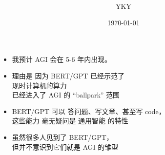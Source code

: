 

\usepackage{color}
\usepackage{mathtools}
\usepackage{hyperref}

%

\usepackage{graphicx} %
\usepackage{tikz-cd}
\usepackage{tikz}
\usepackage[export]{adjustbox}%
\usepackage{verbatim} %


\newcommand{\underdash}[1]{%
	\tikz[baseline=(toUnderline.base)]{
		\node[inner sep=1pt,outer sep=10pt] (toUnderline) {#1};
		\draw[dashed] ([yshift=-0pt]toUnderline.south west) -- ([yshift=-0pt]toUnderline.south east);
	}%
}%


\newcommand{\highlight}[1]{\colorbox{pink}{$\displaystyle #1$}}

\let\oldtextbf\textbf
\renewcommand{\textbf}[1]{\textcolor{blue}{\oldtextbf{#1}}}

\newcommand{\emp}[1]{{\color{blue}\textbf{#1}}}
\newcommand*\confoundFace{$\vcenter{\hbox{\texttt{[image: ../2020/../confounded-face.jpg]}}}$}
\newcommand{\underconst}{\texttt{[image: ../2020/UnderConst.png]}}
\newcommand{\witness}{\scalebox{0.6}{$\blacksquare$}}
\providecommand\Heytingarrow{\relbar\joinrel\mathrel{\vcenter{\hbox{\scalebox{0.75}{$\rhd$}}}}}



\title{\bfseries\color{blue}{\Huge《AGI in 5 minutes》}}
\author{YKY} %
\date{\today} %

\maketitle
{}

\begin{itemize}
	\item 我预计 AGI 会在 5-6 年内出现。
	\item 理由是 因为 BERT/GPT 已经示范了 \\
		 现时计算机的算力 \\
		 已经进入了 AGI 的 ``ballpark'' 范围
	\item BERT/GPT 可以 答问题、写文章、甚至写 code，\\
		这些能力 毫无疑问是 通用智能 的特性
	\item 虽然很多人见到了 BERT/GPT，\\
		但并不意识到它们就是 AGI 的雏型
\end{itemize}

